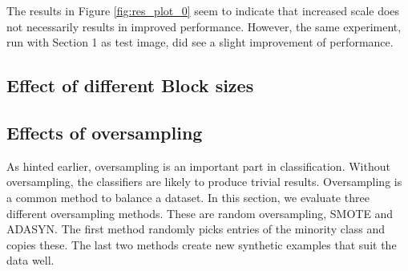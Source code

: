 The results in Figure \ref{fig:res_plot_0} seem to indicate that increased scale does not necessarily results in improved performance. However, the same experiment, run with Section 1 as test image, did see a slight improvement of performance.

\subsection{Effect of different Block sizes}




\subsection{Effects of oversampling}
As hinted earlier, oversampling is an important part in classification. Without oversampling, the classifiers are likely to produce trivial results. Oversampling is a common method to balance a dataset. In this section, we evaluate three different oversampling methods. These are random oversampling, SMOTE and ADASYN. The first method randomly picks entries of the minority class and copies these. The last two methods create new synthetic examples that suit the data well.


